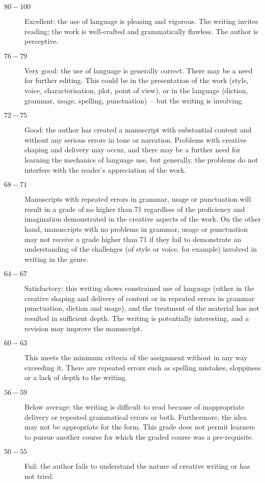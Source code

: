 \documentclass[10pt,DIV09,letterpaper,oneside,headsepline]{scrreprt}
\begin{document}
\begin{description}

\item[$80-100$] Excellent: the use of language is pleasing and
vigorous. The writing invites reading; the work is well-crafted and
grammatically flawless. The author is perceptive.

\item[$76-79$] Very good: the use of language is generally correct.
There may be a need for further editing. This could be in the
presentation of the work (style, voice, characterisation, plot,
point of view), or in the language (diction, grammar, usage,
spelling, punctuation)~-- but the writing is involving.

\item[$72-75$] Good: the author has created a manuscript with
substantial content and without any serious errors in tone or
narration. Problems with creative shaping and delivery may occur,
and there may be a further need for learning the mechanics of
language use, but generally, the problems do not interfere with the
reader's appreciation of the work.

\item[$68-71$] Manuscripts with repeated errors in grammar, usage or
punctuation will result in a grade of no higher than 71 regardless
of the proficiency and imagination demonstrated in the creative
aspects of the work. On the other hand, manuscripts with no problems
in grammar, usage or punctuation may not receive a grade higher than
71 if they fail to demonstrate an understanding of the challenges
(of style or voice, for example) involved in writing in the genre.


\item[$64-67$] Satisfactory: this writing shows constrained use of language
(either in the creative shaping and delivery of content or in
repeated errors in grammar punctuation, diction and usage), and the
treatment of the material has not resulted in sufficient depth. The
writing is potentially interesting, and a revision may improve the
manuscript.

\item[$60-63$] This meets the minimum criteria of the assignment
without in any way exceeding it. There are repeated errors such as
spelling mistakes, sloppiness or a lack of depth to the writing.


\item[$56-59$] Below average: the writing is difficult to read because
of inappropriate delivery or repeated grammatical errors or both.
Furthermore, the idea may not be appropriate for the form. This
grade does not permit learners to pursue another course for which
the graded course was a pre-requisite.

\item[$50-55$] Fail: the author fails to understand the nature of
creative writing or has not tried.

\end{description}
\end{document}
